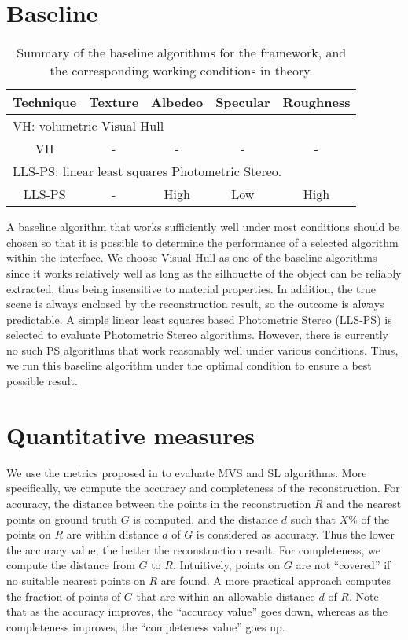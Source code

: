 \section{Baseline}
\begin{table}[!htbp]
\centering
\begin{tabular}{c|c|c|c|c}
\toprule
Technique & Texture & Albedeo & Specular & Roughness\\
\midrule
\multicolumn{5}{l}{VH: volumetric Visual Hull}\\
\midrule
VH & - & - & - & -\\
\midrule
\multicolumn{5}{l}{LLS-PS: linear least squares Photometric Stereo.}\\
\midrule
LLS-PS & - & High & Low & High\\
\bottomrule
\end{tabular}
\caption{Summary of the baseline algorithms for the framework, and the corresponding working conditions in theory.}
\label{tab:selected_baseline_algos}
\end{table}
A baseline algorithm that works sufficiently well under most conditions should be chosen so that it is possible to determine the performance of a selected algorithm within the interface. We choose Visual Hull as one of the baseline algorithms since it works relatively well as long as the silhouette of the object can be reliably extracted, thus being insensitive to material properties. In addition, the true scene is always enclosed by the reconstruction result, so the outcome is always predictable. A simple linear least squares based Photometric Stereo (LLS-PS) is selected to evaluate Photometric Stereo algorithms. However, there is currently no such PS algorithms that work reasonably well under various conditions. Thus, we run this baseline algorithm under the optimal condition to ensure a best possible result.

\section{Quantitative measures}
We use the metrics proposed in \cite{seitz2006comparison} to evaluate MVS and SL algorithms. More specifically, we compute the accuracy and completeness of the reconstruction. For accuracy, the distance between the points in the reconstruction $R$ and the nearest points on ground truth $G$ is computed, and the distance $d$ such that $X\%$ of the points on $R$ are within distance $d$ of $G$ is considered as accuracy. Thus the lower the accuracy value, the better the reconstruction result. For completeness, we compute the distance from $G$ to $R$. Intuitively, points on $G$ are not ``covered'' if no suitable nearest points on $R$ are found. A more practical approach computes the fraction of points of $G$ that are within an allowable distance $d$ of $R$.
Note that as the accuracy improves, the ``accuracy value'' goes down, whereas as the completeness improves, the ``completeness value'' goes up.

